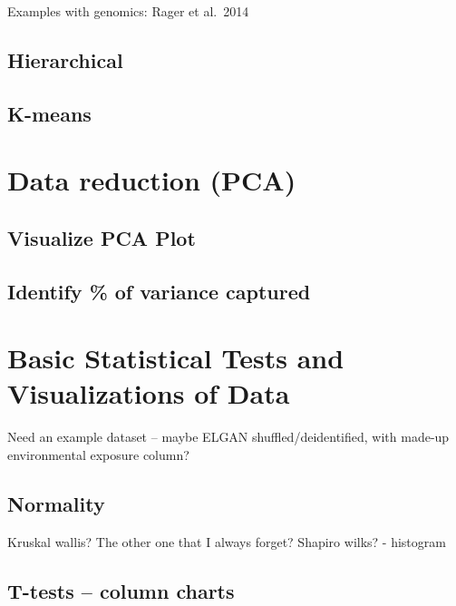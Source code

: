 \documentclass[
]{book}
\begin{document}
Examples with genomics: Rager et al.~2014

\hypertarget{hierarchical}{%
\subsection{Hierarchical}\label{hierarchical}}

\hypertarget{k-means}{%
\subsection{K-means}\label{k-means}}

\hypertarget{data-reduction-pca}{%
\section{Data reduction (PCA)}\label{data-reduction-pca}}

\hypertarget{visualize-pca-plot}{%
\subsection{Visualize PCA Plot}\label{visualize-pca-plot}}

\hypertarget{identify-of-variance-captured}{%
\subsection{Identify \% of variance captured}\label{identify-of-variance-captured}}

\hypertarget{basic-statistical-tests-and-visualizations-of-data}{%
\section{Basic Statistical Tests and Visualizations of Data}\label{basic-statistical-tests-and-visualizations-of-data}}

Need an example dataset -- maybe ELGAN shuffled/deidentified, with made-up environmental exposure column?

\hypertarget{normality}{%
\subsection{Normality}\label{normality}}

Kruskal wallis? The other one that I always forget? Shapiro wilks? - histogram

\hypertarget{t-tests-column-charts}{%
\subsection{T-tests -- column charts}\label{t-tests-column-charts}}
\end{document}
